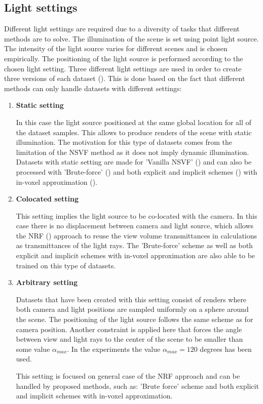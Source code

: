 \subsection{Light settings}

Different light settings are required due to a diversity of tasks that different methods are to solve.
The illumination of the scene is set using point light source.
The intensity of the light source varies for different scenes and is chosen empirically.
The positioning of the light source is performed according to the chosen light setting.
Three different light settings are used in order to create three versions of each dataset ().
This is done based on the fact that different methods can only handle datasets with different settings:
\begin{enumerate}
    \item \textbf{Static setting}
    
    In this case the light source positioned at the same global location for all of the dataset samples.
    This allows to produce renders of the scene with static illumination.
    The motivation for this type of datasets comes from the limitation of the NSVF method
    as it does not imply dynamic illumination.
    Datasets with static setting are made for 'Vanilla NSVF' (\cite{liu2021neural})
    and can also be processed with 'Brute-force' ()
    and both explicit and implicit schemes ()
    with in-voxel approximation ().
    
    \item \textbf{Colocated setting}
    
    This setting implies the light source to be co-located with the camera.
    In this case there is no displacement between camera and light source,
    which allows the NRF (\cite{bi2020neural}) approach to reuse the view volume transmittances
    in calculations as transmittances of the light rays.
    The 'Brute-force' scheme as well as both explicit and implicit schemes
    with in-voxel approximation are also able to be trained on this type of datasets.
    
    \item \textbf{Arbitrary setting}
    
    Datasets that have been created with this setting consist of renders
    where both camera and light positions are sampled uniformly on a sphere around the scene.
    The positioning of the light source follows the same scheme as for camera position.
    Another constraint is applied here that forces the angle
    between view and light rays to the center of the scene to be smaller
    than some value $\alpha_{max}$.
    In the experiments the value $\alpha_{max} = 120$ degrees has been used.
    
    This setting is focused on general case of the NRF approach
    and can be handled by proposed methods, such as: 'Brute force' scheme
    and both explicit and implicit schemes with in-voxel approximation.
\end{enumerate}

